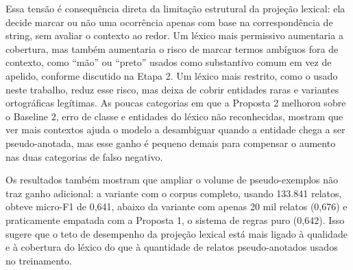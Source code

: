 \documentclass[12pt,a4paper]{article}
\begin{document}
Essa tensão é consequência direta da limitação estrutural da projeção
lexical: ela decide marcar ou não uma ocorrência apenas com base na
correspondência de string, sem avaliar o contexto ao redor. Um léxico
mais permissivo aumentaria a cobertura, mas também aumentaria o risco de
marcar termos ambíguos fora de contexto, como ``mão'' ou ``preto'' usados
como substantivo comum em vez de apelido, conforme discutido na Etapa 2. Um
léxico mais restrito, como o usado neste trabalho, reduz esse risco, mas
deixa de cobrir entidades raras e variantes ortográficas legítimas. As poucas
categorias em que a Proposta 2 melhorou sobre o Baseline 2, erro de classe e
entidades do léxico não reconhecidas, mostram que ver mais contextos ajuda o
modelo a desambiguar quando a entidade chega a ser pseudo-anotada, mas esse
ganho é pequeno demais para compensar o aumento nas duas categorias de falso
negativo.

Os resultados também mostram que ampliar o volume de pseudo-exemplos não traz
ganho adicional: a variante com o corpus completo, usando 133.841 relatos,
obteve micro-F1 de 0,641, abaixo da variante com apenas 20 mil relatos
(0,676) e praticamente empatada com a Proposta 1, o sistema de regras puro
(0,642). Isso sugere que o teto de desempenho da projeção lexical está mais
ligado à qualidade e à cobertura do léxico do que à quantidade de relatos
pseudo-anotados usados no treinamento.



\end{document}
